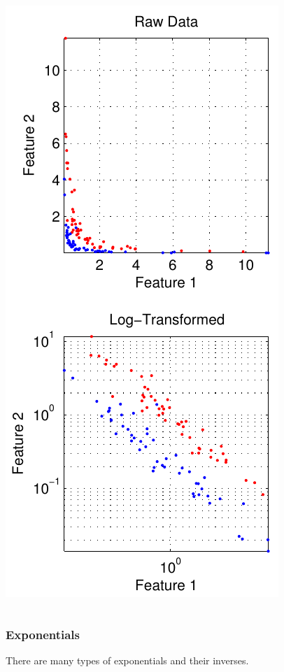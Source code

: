 \begin{frame}
\begin{columns}[c]
\includegraphics[width=\textwidth]{log_transformed}
\end{columns}
\end{frame}

\begin{frame}
\frametitle{Exponentials}
There are many types of exponentials and their inverses.
\end{frame}

